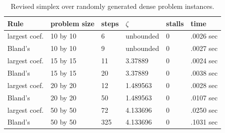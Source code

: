 \documentclass[9pt]{article}
\begin{document}
\begin{table}[ht]
    \centering
    \begin{small}
    \begin{tabular}{l l l l l l}
        Rule & problem size & steps & $\zeta$ & stalls & time \\ [0.5ex]
        \hline
        largest coef. & 10 by 10 & 6 & unbounded & 0 & .0026 sec \\
        Bland's & 10 by 10 & 9 & unbounded & 0 & .0027 sec \\
        largest coef. & 15 by 15 & 11 & 3.37889 & 0 & .0024 sec \\
        Bland's & 15 by 15 & 20 & 3.37889 & 0 & .0038 sec \\
        largest coef. & 20 by 20 & 12 & 1.489563 & 0 & .0028 sec \\
        Bland's & 20 by 20 & 50 & 1.489563 & 0 & .0107 sec \\
        largest coef. & 50 by 50 & 72 & 4.133696 & 0 & .0250 sec \\
        Bland's & 50 by 50 & 325 & 4.133696 & 0 & .1031 sec \\
    \end{tabular}
\caption{Revised simplex over randomly generated dense problem instances.}
\end{small}
\end{table}
\end{document}
